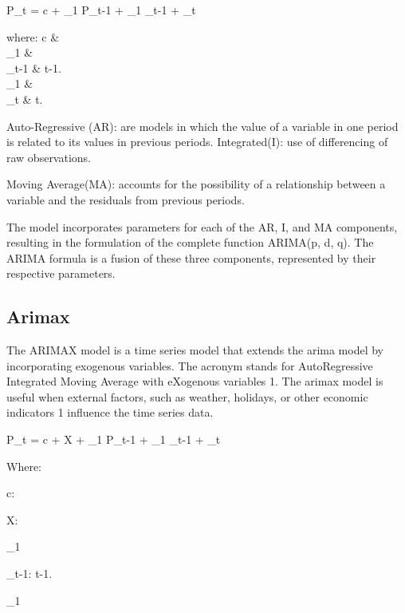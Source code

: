 \documentclass{ieeeojies}
\begin{document}
\Delta P_t = c + \phi_1 \Delta P_{t-1} + \theta_1 \epsilon_{t-1} + \epsilon_t

where:
c &  \\
\phi_1 &  \\
\epsilon_{t-1} &  t-1. \\
\theta_1 &  \\
\epsilon_t &  t.

Auto-Regressive (AR): are models in which the value of a variable in one period is related to its values in previous periods. 
Integrated(I): use of differencing of raw observations.

Moving Average(MA): accounts for the possibility of a relationship between a variable and the residuals from previous periods.

The model incorporates parameters for each of the AR, I, and MA components, resulting in the formulation of the complete function ARIMA(p, d, q). The ARIMA formula is a fusion of these three components, represented by their respective parameters.

\subsection{Arimax}
The ARIMAX model is a time series model that extends the arima model by incorporating exogenous variables. The acronym stands for AutoRegressive Integrated Moving Average with eXogenous variables 1. The arimax model is useful when external factors, such as weather, holidays, or other economic indicators 1 influence the time series data. \cite{r18} \cite{r21}

\Delta P_t = c + \beta X + \phi_1 \Delta P_{t-1} + \theta_1 \epsilon_{t-1} + \epsilon_t

Where:

c:

X:

\beta {}

\phi_1 

\epsilon_{t-1}: t-1.

\theta_1 
\end{document}
